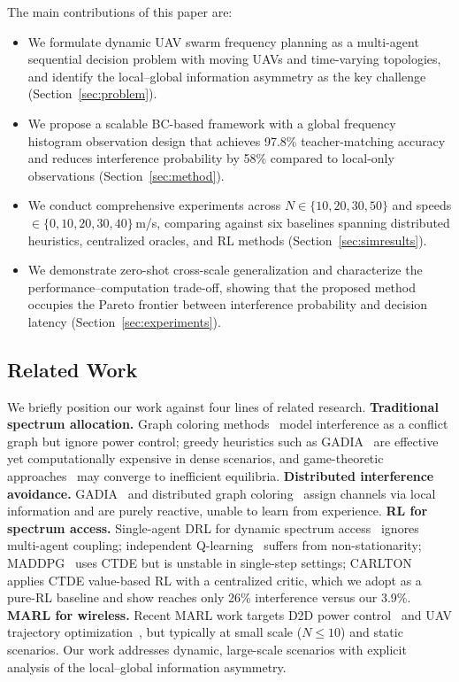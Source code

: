 \documentclass[journal]{IEEEtran}
\begin{document}
The main contributions of this paper are:

\begin{itemize}
    \item We formulate dynamic UAV swarm frequency planning as a multi-agent sequential decision problem with moving UAVs and time-varying topologies, and identify the local--global information asymmetry as the key challenge (Section~\ref{sec:problem}).
    \item We propose a scalable BC-based framework with a global frequency histogram observation design that achieves 97.8\% teacher-matching accuracy and reduces interference probability by 58\% compared to local-only observations (Section~\ref{sec:method}).
    \item We conduct comprehensive experiments across $N \in \{10, 20, 30, 50\}$ and speeds $\in \{0, 10, 20, 30, 40\}$\,m/s, comparing against six baselines spanning distributed heuristics, centralized oracles, and RL methods (Section~\ref{sec:simresults}).
    \item We demonstrate zero-shot cross-scale generalization and characterize the performance--computation trade-off, showing that the proposed method occupies the Pareto frontier between interference probability and decision latency (Section~\ref{sec:experiments}).
\end{itemize}

\subsection{Related Work}
\label{sec:related_intro}
We briefly position our work against four lines of related research.
\textbf{Traditional spectrum allocation.} Graph coloring methods~\cite{ref_coloring} model interference as a conflict graph but ignore power control; greedy heuristics such as GADIA~\cite{ref_gadia} are effective yet computationally expensive in dense scenarios, and game-theoretic approaches~\cite{ref_game} may converge to inefficient equilibria.
\textbf{Distributed interference avoidance.} GADIA~\cite{ref_gadia} and distributed graph coloring~\cite{ref_coloring} assign channels via local information and are purely reactive, unable to learn from experience.
\textbf{RL for spectrum access.} Single-agent DRL for dynamic spectrum access~\cite{ref_drl_dsa} ignores multi-agent coupling; independent Q-learning~\cite{ref_iql} suffers from non-stationarity; MADDPG~\cite{ref_maddpg} uses CTDE but is unstable in single-step settings; CARLTON~\cite{ref_carlton} applies CTDE value-based RL with a centralized critic, which we adopt as a pure-RL baseline and show reaches only 26\% interference versus our 3.9\%.
\textbf{MARL for wireless.} Recent MARL work targets D2D power control~\cite{ref_maddpg_d2d} and UAV trajectory optimization~\cite{ref_maddpg_uav}, but typically at small scale ($N\!\le\!10$) and static scenarios. Our work addresses dynamic, large-scale scenarios with explicit analysis of the local--global information asymmetry.
\end{document}
